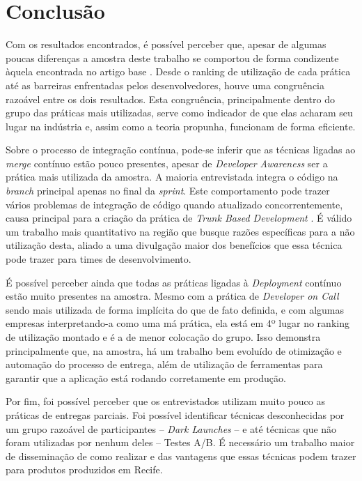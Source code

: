 
\section{Conclusão}

Com os resultados encontrados, é possível perceber que, apesar de algumas poucas diferenças a amostra deste trabalho se comportou de forma condizente àquela encontrada no artigo base \cite{empiricalStudy2016}. Desde o ranking de utilização de cada prática até as barreiras enfrentadas pelos desenvolvedores, houve uma congruência razoável entre os dois resultados. Esta congruência, principalmente dentro do grupo das práticas mais utilizadas, serve como indicador de que elas acharam seu lugar na indústria e, assim como a teoria propunha, funcionam de forma eficiente.

Sobre o processo de integração contínua, pode-se inferir que as técnicas ligadas ao \emph{merge} contínuo estão pouco presentes, apesar de \emph{Developer Awareness} ser a prática mais utilizada da amostra. A maioria entrevistada integra o código na \emph{branch} principal apenas no final da \emph{sprint}. Este comportamento pode trazer vários problemas de integração de código quando atualizado concorrentemente, causa principal para a criação da prática de \emph{Trunk Based Development} \cite{devAndDeploymentFB}. É válido um trabalho mais quantitativo na região que busque razões específicas para a não utilização desta, aliado a uma divulgação maior dos benefícios que essa técnica pode trazer para times de desenvolvimento. 

É possível perceber ainda que todas as práticas ligadas à \emph{Deployment} contínuo estão muito presentes na amostra. Mesmo com a prática de \emph{Developer on Call} sendo mais utilizada de forma implícita do que de fato definida, e com algumas empresas interpretando-a como uma má prática, ela está em 4º lugar no ranking de utilização montado e é a de menor colocação do grupo. Isso demonstra principalmente que, na amostra, há um trabalho bem evoluído de otimização e automação do processo de entrega, além de utilização de ferramentas para garantir que a aplicação está rodando corretamente em produção.

Por fim, foi possível perceber que os entrevistados utilizam muito pouco as práticas de entregas parciais. Foi possível identificar técnicas desconhecidas por um grupo razoável de participantes -- \emph{Dark Launches} -- e até técnicas que não foram utilizadas por nenhum deles -- Testes A/B. É necessário um trabalho maior de disseminação de como realizar e das vantagens que essas técnicas podem trazer para produtos produzidos em Recife.

